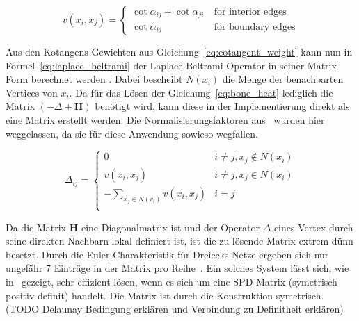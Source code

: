 \begin{equation}
    \label{eq:cotangent_weight}
    v(x_i,x_j) = 
        \begin{cases}
            \cot{\alpha_{ij}}+\cot{\alpha_{ji}}\ & \text{for interior edges} \\
            \cot{\alpha_{ij}} & \text{for boundary edges}
        \end{cases}
\end{equation}

Aus den Kotangens-Gewichten aus Gleichung~\ref{eq:cotangent_weight} kann nun in Formel~\ref{eq:laplace_beltrami} der Laplace-Beltrami Operator in seiner Matrix-Form berechnet werden \cite{spd_solver_paper,laplace_beltrami_paper}. Dabei bescheibt $N(x_i)$ die Menge der benachbarten Vertices von $x_i$. Da für das Lösen der Gleichung~\ref{eq:bone_heat} lediglich die Matrix $(-\Delta+\textbf{H})$ benötigt wird, kann diese in der Implementierung direkt als eine Matrix erstellt werden. Die Normalisierungsfaktoren aus~\cite{spd_solver_paper} wurden hier weggelassen, da sie für diese Anwendung sowieso wegfallen.

\begin{equation}
    \label{eq:laplace_beltrami}
    \Delta_{ij}=
    \begin{cases}
        0 & i \neq j, x_j \notin N(x_i) \\
        v(x_i,x_j) & i \neq j, x_j \in N(x_i) \\
        -\sum_{x_j\in N(v_i)} v(x_i,x_j) & i = j\\
    \end{cases}
\end{equation}

Da die Matrix $\textbf{H}$ eine Diagonalmatrix ist und der Operator $\Delta$ eines Vertex durch seine direkten Nachbarn lokal definiert ist, ist die zu lösende Matrix extrem dünn besetzt. Durch die Euler-Charakteristik für Dreiecks-Netze ergeben sich nur ungefähr $7$ Einträge in der Matrix pro Reihe~\cite{spd_solver_paper}. Ein solches System lässt sich, wie in~\cite{spd_solver_paper} gezeigt, sehr effizient lösen, wenn es sich um eine SPD-Matrix (symetrisch positiv definit) handelt. Die Matrix ist durch die Konstruktion symetrisch. (TODO Delaunay Bedingung erklären und Verbindung zu Definitheit erklären)
